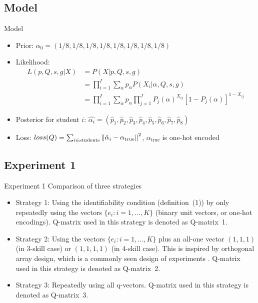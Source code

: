 \documentclass[handout]{beamer}
\begin{document}
\subsection{Model}
\begin{frame}{Model}
	\begin{itemize}
		\item{Prior: $\alpha_0=(1/8,1/8,1/8,1/8,1/8,1/8,1/8,1/8)$}
		\item{Likelihood:\begin{equation}
\begin{split}
L(p,Q,s,g|X) & = P(X|p,Q,s,g) \\
& = \prod_{i=1}^I \sum_{\alpha}p_{\alpha}P(X_i|\alpha, Q, s, g) \\
& = \prod_{i=1}^I \sum_{\alpha}p_{\alpha} \prod_{j=1}^J P_j(\alpha)^{X_{ij}}[1-P_j(\alpha)]^{1-X_{ij}}
\end{split}
\end{equation}}
		\item{Posterior for student $i$: $\hat{\alpha_i} = (\hat{p}_1,\hat{p}_2,\hat{p}_3,\hat{p}_4,\hat{p}_5,\hat{p}_6,\hat{p}_7,\hat{p}_8)$}
		\item{Loss: $ loss(Q) = \sum_{i \in \mathrm{students}} \left\lVert\hat{\alpha}_i - \alpha_{\mathrm{true}}\right\rVert^2$, $\alpha_{\mathrm{true}}$ is one-hot encoded}
	\end{itemize}
\end{frame}


\subsection{Experiment 1}
\begin{frame}{Experiment 1}
Comparison of three strategies
\begin{itemize}
\item Strategy 1: Using the identifiability condition (definition~(1)) by only repeatedly using the vectors $\{e_{i}:i=1,...,K\}$ (binary unit vectors, or one-hot encodings). Q-matrix used in this strategy is denoted as Q-matrix~1.
\item Strategy 2: Using the vectors $\{e_{i}:i=1,...,K\}$ plus an all-one vector $(1,1,1)$ (in 3-skill case) or $(1,1,1,1)$ (in 4-skill case). This is inspired by orthogonal array design, which is a commonly seen design of experiments \cite{montgomery2017design}. Q-matrix used in this strategy is denoted as Q-matrix~2.
\item Strategy 3: Repeatedly using all q-vectors. Q-matrix used in this strategy is denoted as Q-matrix~3.
\end{itemize}
\end{frame}
\end{document}
